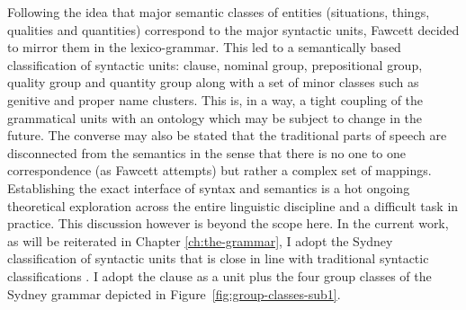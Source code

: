     Following the idea that major semantic classes of entities (situations, things, qualities and quantities) correspond to the major syntactic units, Fawcett decided to mirror them in the lexico-grammar. This led to a semantically based classification of syntactic units: clause, nominal group, prepositional group, quality group and quantity group \citep[193--194]{Fawcett2000} along with a set of minor classes such as genitive and proper name clusters. This is, in a way, a tight coupling of the grammatical units with an ontology which may be subject to change in the future. The converse may also be stated that the traditional parts of speech are disconnected from the semantics in the sense that there is no one to one correspondence (as Fawcett attempts) but rather a complex set of mappings. Establishing the exact interface of syntax and semantics is a hot ongoing theoretical exploration across the entire linguistic discipline and a difficult task in practice. This discussion however is beyond the scope here.   
    In the current work, as will be reiterated in Chapter \ref{ch:the-grammar}, I adopt the Sydney classification of syntactic units that is close in line with traditional syntactic classifications \citep{Quirk1985}. I adopt the clause as a unit plus the four group classes of the Sydney grammar depicted in \mbox{Figure \ref{fig:group-classes-sub1}}. 
    
